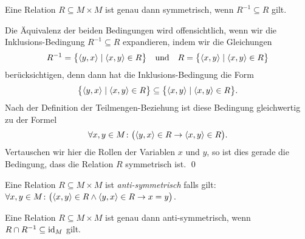 \begin{Satz}
Eine Relation $R \subseteq M \times M$ ist genau dann symmetrisch, wenn $R^{-1} \subseteq R$ gilt.
\end{Satz}

\proof
Die \"{A}quivalenz der beiden Bedingungen wird offensichtlich, wenn wir die Inklusions-Bedingung
$R^{-1} \subseteq R$ expandieren, indem wir die Gleichungen
\[ R^{-1} = \bigl\{ \pair(y,x) \mid \pair(x,y) \in R \bigr\} \quad \mbox{und} \quad
   R      = \bigl\{ \pair(x,y) \mid \pair(x,y) \in R \bigr\} \]
ber\"{u}cksichtigen, denn dann hat die Inklusions-Bedingung die Form
\[ \bigl\{ \pair(y,x) \mid \pair(x,y) \in R \bigr\} \subseteq
   \bigl\{ \pair(x,y) \mid \pair(x,y) \in R \bigr\}. \]
Nach der Definition der Teilmengen-Beziehung ist diese Bedingung gleichwertig zu der Formel
\[ \forall x, y \in M \colon \bigl(\pair(y,x) \in R \rightarrow\pair(x,y) \in R\bigr). 
\]
Vertauschen wir hier die Rollen der Variablen $x$ und $y$, so ist dies gerade die Bedingung, dass
die Relation $R$ symmetrisch ist. \qed

\begin{Definition}
Eine Relation $R \subseteq M \times M$  ist \emph{anti-symmetrisch} falls gilt: \\[0.2cm]
\hspace*{1.3cm} 
$\forall x, y \in M \colon \bigl(\pair(x,y) \in R \wedge \pair(y,x) \in R \rightarrow x = y\bigr)$. \eox
\end{Definition}

\begin{Satz}
Eine Relation $R \subseteq M \times M$  ist genau dann anti-symmetrisch, wenn
$R \cap R^{-1} \subseteq \mbox{\rm id}_{M}$ gilt.
\end{Satz}

